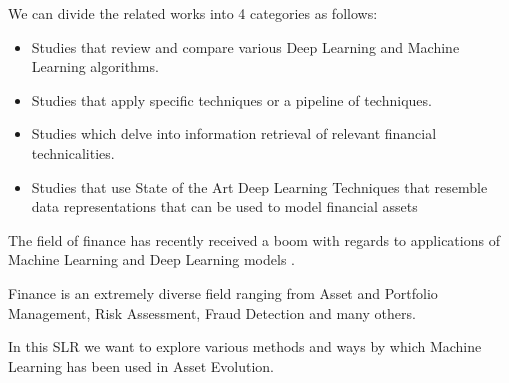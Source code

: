 \documentclass[11pt]{article}
\begin{document}
We can divide the related works into 4 categories as follows:

\begin{itemize}

\item Studies that review and compare various Deep Learning and Machine Learning algorithms.
\item Studies that apply specific techniques or a pipeline of techniques.
\item Studies which delve into information retrieval of relevant financial technicalities.
\item Studies that use State of the Art Deep Learning Techniques that resemble data representations that can be used to model financial assets



\end{itemize}

The field of finance has recently received a boom with regards to applications of Machine Learning and Deep Learning models \citep[see][]{ozbayoglu2020survey}.

Finance is an extremely diverse field ranging from Asset and Portfolio Management, Risk Assessment, Fraud Detection and many others. 

In this SLR we want to explore various methods and ways by which Machine Learning has been used in Asset Evolution. 
\end{document}
